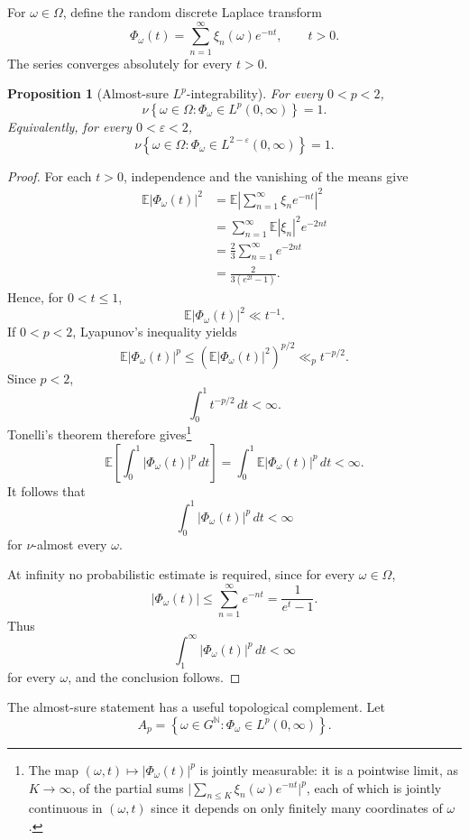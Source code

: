 \documentclass[11pt]{article}
\newtheorem{proposition}[theorem]{Proposition}
\theoremstyle{remark}
\begin{document}
For \(\omega\in\Omega\), define the random discrete Laplace transform
\[
\Phi_\omega(t)
=
\sum_{n=1}^{\infty}\xi_n(\omega)e^{-nt},
\qquad t>0.
\]
The series converges absolutely for every \(t>0\).

\begin{proposition}[Almost-sure \(L^p\)-integrability]
\label{prop:random-laplace}
For every \(0<p<2\),
\[
\nu\left\{
\omega\in\Omega:
\Phi_\omega\in L^p(0,\infty)
\right\}=1.
\]
Equivalently, for every \(0<\varepsilon<2\),
\[
\nu\left\{
\omega\in\Omega:
\Phi_\omega\in L^{2-\varepsilon}(0,\infty)
\right\}=1.
\]
\end{proposition}

\begin{proof}
For each \(t>0\), independence and the vanishing of the means give
\[
\begin{aligned}
\mathbb E|\Phi_\omega(t)|^2
&=
\mathbb E\left|
\sum_{n=1}^{\infty}\xi_n e^{-nt}
\right|^2\\
&=
\sum_{n=1}^{\infty}\mathbb E|\xi_n|^2e^{-2nt}\\
&=
\frac23\sum_{n=1}^{\infty}e^{-2nt}\\
&=
\frac{2}{3(e^{2t}-1)}.
\end{aligned}
\]
Hence, for \(0<t\leq1\),
\[
\mathbb E|\Phi_\omega(t)|^2\ll t^{-1}.
\]
If \(0<p<2\), Lyapunov's inequality yields
\[
\mathbb E|\Phi_\omega(t)|^p
\leq
\left(\mathbb E|\Phi_\omega(t)|^2\right)^{p/2}
\ll_p t^{-p/2}.
\]
Since \(p<2\),
\[
\int_0^1 t^{-p/2}\,dt<\infty.
\]
Tonelli's theorem therefore gives\footnote{The map
\((\omega,t)\mapsto|\Phi_\omega(t)|^p\) is jointly measurable: it is a
pointwise limit, as \(K\to\infty\), of the partial sums
\(\bigl|\sum_{n\leq K}\xi_n(\omega)e^{-nt}\bigr|^p\), each of which is
jointly continuous in \((\omega,t)\) since it depends on only finitely
many coordinates of \(\omega\).}
\[
\mathbb E\left[
\int_0^1|\Phi_\omega(t)|^p\,dt
\right]
=
\int_0^1\mathbb E|\Phi_\omega(t)|^p\,dt
<\infty.
\]
It follows that
\[
\int_0^1|\Phi_\omega(t)|^p\,dt<\infty
\]
for \(\nu\)-almost every \(\omega\).

At infinity no probabilistic estimate is required, since for every
\(\omega\in\Omega\),
\[
|\Phi_\omega(t)|
\leq
\sum_{n=1}^{\infty}e^{-nt}
=
\frac1{e^t-1}.
\]
Thus
\[
\int_1^\infty|\Phi_\omega(t)|^p\,dt<\infty
\]
for every \(\omega\), and the conclusion follows.
\end{proof}

The almost-sure statement has a useful topological complement.  Let
\[
A_p=
\left\{
\omega\in G^{\mathbb N}:
\Phi_\omega\in L^p(0,\infty)
\right\}.
\]
\end{document}

